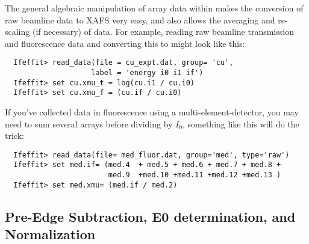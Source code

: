 \documentclass[11pt]{article}
\begin{document}
The general algebraic manipulation of array data within {\ifeffit} makes
the conversion of raw beamline data to XAFS {\muE} very easy, and also
allows the averaging and re-scaling (if necessary) of data. For example,
reading raw beamline transmission and fluorescence data and converting this
to {\muE} might look like this:

{\small\begin{verbatim}
  Ifeffit> read_data(file = cu_expt.dat, group= 'cu',
                    label = 'energy i0 i1 if')
  Ifeffit> set cu.xmu_t = log(cu.i1 / cu.i0)
  Ifeffit> set cu.xmu_f = (cu.if / cu.i0)
\end{verbatim}}\noindent
If you've collected data in fluorescence using a multi-element-detector,
you may need to sum several arrays before dividing by $I_0$, something
like this will do the trick:
{\small\begin{verbatim}
  Ifeffit> read_data(file= med_fluor.dat, group='med', type='raw')
  Ifeffit> set med.if= (med.4  + med.5 + med.6 + med.7 + med.8 +
                        med.9  +med.10 +med.11 +med.12 +med.13 )
  Ifeffit> set med.xmu= (med.if / med.2)
\end{verbatim}}\noindent


\subsection{Pre-Edge Subtraction, E0 determination, and Normalization}
\label{s:xafs-process:preedge}
\end{document}

